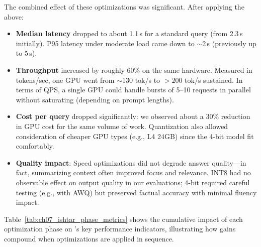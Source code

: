 The combined effect of these optimizations was significant. After applying the above:
\begin{itemize}
\item \textbf{Median latency} dropped to about 1.1\,s for a standard query (from 2.3\,s initially). P95 latency under moderate load came down to $\sim$2\,s (previously up to 5\,s).
\item \textbf{Throughput} increased by roughly 60\% on the same hardware. Measured in tokens/sec, one GPU went from $\sim$130 tok/s to $>\!200$ tok/s sustained. In terms of QPS, a single GPU could handle bursts of 5--10 requests in parallel without saturating (depending on prompt lengths).
\item \textbf{Cost per query} dropped significantly: we observed about a 30\% reduction in GPU cost for the same volume of work. Quantization also allowed consideration of cheaper GPU types (e.g., L4 24GB) since the 4-bit model fit comfortably.
\item \textbf{Quality impact}: Speed optimizations did not degrade answer quality---in fact, summarizing context often improved focus and relevance. INT8 had no observable effect on output quality in our evaluations; 4-bit required careful testing (e.g., with AWQ) but preserved factual accuracy with minimal fluency impact.
\end{itemize}

Table~\ref{tab:ch07_ishtar_phase_metrics} shows the cumulative impact of each optimization phase on \ishtar{}'s key performance indicators, illustrating how gains compound when optimizations are applied in sequence.


